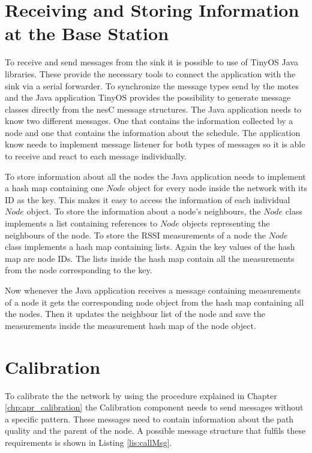 \section{Receiving and Storing Information at the Base Station}
\label{chp:imp_baseStation}
To receive and send messages from the sink it is possible to use of TinyOS Java libraries. These provide the necessary tools to connect the application with the sink via a serial forwarder. To synchronize the message types send by the motes and the Java application TinyOS provides the possibility to generate message classes directly from the nesC message structures. The Java application needs to know two different messages. One that contains the information collected by a node and one that contains the information about the schedule. The application know needs to implement message listener for both types of messages so it is able to receive and react to each message individually.

To store information about all the nodes the Java application needs to implement a hash map containing one $Node$ object for every node inside the network with its ID as the key. This makes it easy to access the information of each individual $Node$ object. To store the information about a node's neighbours, the $Node$ class implements a list containing references to $Node$ objects representing the neighbours of the node. To store the RSSI measurements of a node the $Node$ class implements a hash map containing lists. Again the key values of the hash map are node IDs. The lists inside the hash map contain all the measurements from the node corresponding to the key. 

Now whenever the Java application receives a message containing measurements of a node it gets the corresponding node object from the hash map containing all the nodes. Then it updates the neighbour list of the node and save the measurements inside the measurement hash map of the node object.
\section{Calibration}
\label{chp:imp_calibration}
To calibrate the the network by using the procedure explained in Chapter \ref{chp:apr_calibration} the Calibration component needs to send messages without a specific pattern. These messages need to contain information about the path quality and the parent of the node. A possible message structure that fulfils these requirements is shown in Listing \ref{lis:callMsg}. 

